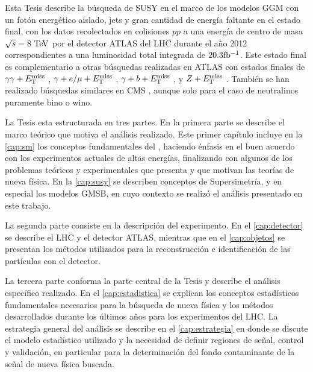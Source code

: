 
Esta Tesis describe la búsqueda de SUSY en el marco de los modelos GGM con
un fotón energético aislado, jets
y gran cantidad de energía faltante en el estado final, con los datos recolectados en colisiones $pp$
a una energía de centro de masa $\sqrt{s} = 8 \tev$ por el detector
ATLAS del LHC durante el a\~no 2012 correspondientes a una luminosidad total
integrada de $20.3 \mbox{fb$^{-1}$}$. Este estado final es complementario a otras búsquedas
realizadas en ATLAS con estados finales de $\gamma\gamma+E_{\mathrm{T}}^{\mathrm{miss}}$ \cite{Aad2012519,ATLAS-CONF-2014-001},
$\gamma+e/\mu+E_{\mathrm{T}}^{\mathrm{miss}}$ \cite{ATLAS-CONF-2012-144}, $\gamma+b+E_{\mathrm{T}}^{\mathrm{miss}}$
\cite{Aad:2012jva}, y $Z+E_{\mathrm{T}}^{\mathrm{miss}}$ \cite{ATLAS-CONF-2012-152}.
También se han realizado búsquedas similares en CMS \cite{CMS-PAS-SUS-12-018,CMS-PAS-SUS-14-004},
aunque solo para el caso de neutralinos puramente bino o wino.


La Tesis esta estructurada en tres partes. En la primera parte se describe el
marco teórico que motiva el análisis realizado. Este primer capítulo incluye en
la \cref{cap:sm} los conceptos fundamentales del {\SM}, haciendo énfasis en el
buen acuerdo con los experimentos actuales de altas energías, finalizando con
algunos de los problemas teóricos y experimentales que presenta y que motivan
las teorías de nueva física. En la \cref{cap:susy} se describen conceptos de
Supersimetría, y en especial los modelos GMSB, en cuyo contexto se realizó el
análisis presentado en este trabajo.

La segunda parte consiste en la descripción del experimento. En el
\cref{cap:detector} se describe el LHC y el detector ATLAS, mientras que en el
\cref{cap:objetos} se presentan los métodos utilizados para la reconstrucción e
identificación de las partículas con el detector.

La tercera parte conforma la parte central de la Tesis y describe el análisis
específico realizado. En el \cref{cap:estadistica} se explican los conceptos
estadísticos fundamentales necesarios para la búsqueda de nueva física y los
métodos desarrollados durante los últimos a\~nos para los experimentos del LHC.
La estrategia general del análisis se describe en el \cref{cap:estrategia} en
donde se discute el modelo estadístico utilizado y la necesidad de definir
regiones de señal, control y validación, en particular para la determinación del
fondo contaminante de la señal de nueva física buscada.

